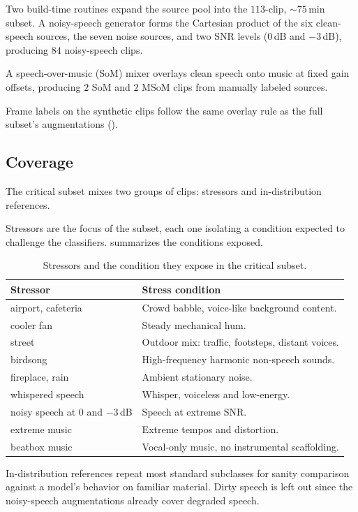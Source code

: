 Two build-time routines expand the source pool into the $113$-clip, $\sim 75$\,min subset.
A noisy-speech generator forms the Cartesian product of the six clean-speech sources, the seven noise sources, and two SNR levels ($0$\,dB and $-3$\,dB), producing $84$ noisy-speech clips.

A speech-over-music (SoM) mixer overlays clean speech onto music at fixed gain offsets, producing $2$ SoM and $2$ MSoM clips from manually labeled sources.

Frame labels on the synthetic clips follow the same overlay rule as the full subset's augmentations ().

\subsection{Coverage}

The critical subset mixes two groups of clips: stressors and in-distribution references.

Stressors are the focus of the subset, each one isolating a condition expected to challenge the classifiers.
 summarizes the conditions exposed.

\begin{table}[h]
\centering
\begin{tabular}{lp{}}
\toprule
\textbf{Stressor} & \textbf{Stress condition} \\
\midrule
airport, cafeteria  & Crowd babble, voice-like background content. \\
cooler fan          & Steady mechanical hum. \\
street              & Outdoor mix: traffic, footsteps, distant voices. \\
birdsong            & High-frequency harmonic non-speech sounds. \\
fireplace, rain     & Ambient stationary noise. \\
whispered speech      & Whisper, voiceless and low-energy. \\
noisy speech at $0$ and $-3$\,dB & Speech at extreme SNR. \\
extreme music       & Extreme tempos and distortion. \\
beatbox music       & Vocal-only music, no instrumental scaffolding. \\
\bottomrule
\end{tabular}
\caption{Stressors and the condition they expose in the critical subset.}
\label{tab:dataset_crit_subclasses}
\end{table}

In-distribution references repeat most standard subclasses for sanity comparison against a model's behavior on familiar material.
Dirty speech is left out since the noisy-speech augmentations already cover degraded speech.

